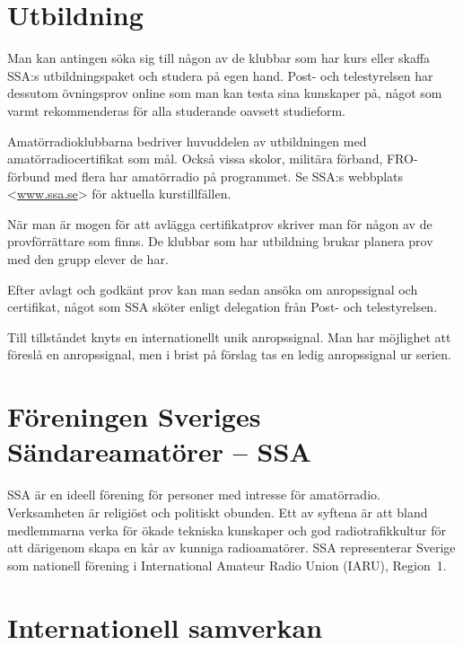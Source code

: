 
\newpage
\section*{Utbildning}

Man kan antingen söka sig till någon av de klubbar som har kurs eller skaffa
SSA:s utbildningspaket och studera på egen hand.
Post- och telestyrelsen har dessutom övningsprov online som man kan testa sina
kunskaper på, något som varmt rekommenderas för alla studerande oavsett
studieform.

Amatörradioklubbarna bedriver huvuddelen av utbildningen med
amatör\-radio\-certi\-fikat som mål.
Också vissa skolor, militära förband, FRO-förbund med flera har amatörradio på
programmet.
Se SSA:s webbplats <\href{https://www.ssa.se}{www.ssa.se}> för aktuella
kurstillfällen.

När man är mogen för att avlägga certifikatprov skriver man för någon av de
provförrättare som finns.
De klubbar som har utbildning brukar planera prov med den grupp elever de har.

Efter avlagt och godkänt prov kan man sedan ansöka om anropssignal och
certifikat, något som SSA sköter enligt delegation från Post- och telestyrelsen.

Till tillståndet knyts en internationellt unik anropssignal.
Man har möjlighet att föreslå en anropssignal, men i brist på förslag tas en
ledig anropssignal ur serien.

\section*{Föreningen Sveriges Sändareamatörer -- SSA}

SSA är en ideell förening för personer med intresse för amatörradio.
Verksamheten är religiöst och politiskt obunden.
Ett av syftena är att bland medlemmarna verka för ökade tekniska kunskaper och
god radiotrafikkultur för att därigenom skapa en kår av kunniga radioamatörer.
SSA representerar Sverige som nationell förening i
International Amateur Radio Union (IARU), Region~1.

\clearpage
\section*{Internationell samverkan}

